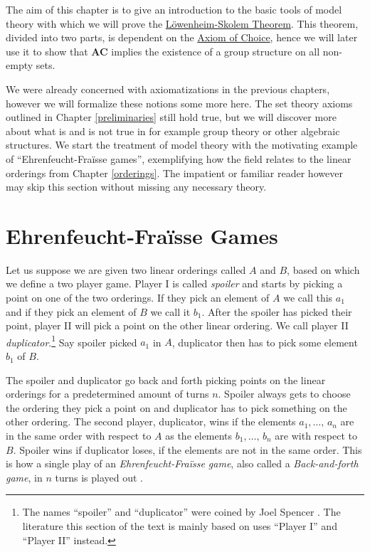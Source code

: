 \documentclass[../../main.tex]{subfiles}
\begin{document}
The aim of this chapter is to give an introduction to the basic tools of model theory with which we will prove the \hyperref[up-lowenheim-skolem]{Löwenheim-Skolem Theorem}.
This theorem, divided into two parts, is dependent on the \hyperref[choice-axiom]{Axiom of Choice}, 
hence we will later use it to show that \textbf{AC} implies the existence of a group structure on all non-empty sets.

We were already concerned with axiomatizations in the previous chapters, however we will formalize these notions some more here.
The set theory axioms outlined in Chapter \ref{preliminaries} still hold true, 
but we will discover more about what is and is not true in for example group theory or other algebraic structures.
We start the treatment of model theory with the motivating example of ``Ehrenfeucht-Fra\"isse games'', 
exemplifying how the field relates to the linear orderings from Chapter \ref{orderings}.
The impatient or familiar reader however may skip this section without missing any necessary theory.

\section{Ehrenfeucht-Fra\"isse Games}
Let us suppose we are given two linear orderings called $A$ and $B$, based on which we define a two player game.
Player I is called \textit{spoiler} and starts by picking a point on one of the two orderings.
If they pick an element of $A$ we call this $a_1$ and if they pick an element of $B$ we call it $b_1$.
After the spoiler has picked their point, player II will pick a point on the other linear ordering. 
We call player II \textit{duplicator}.\footnote{The names ``spoiler'' and ``duplicator'' were coined by Joel Spencer \cite[\S 6]{Wil24}.
The literature \cite{Ros82} this section of the text is mainly based on uses ``Player I'' and ``Player II'' instead.}
Say spoiler picked $a_1$ in $A$, duplicator then has to pick some element $b_1$ of $B$.

The spoiler and duplicator go back and forth picking points on the linear orderings for a predetermined amount of turns $n$.
Spoiler always gets to choose the ordering they pick a point on and duplicator has to pick something on the other ordering.
The second player, duplicator, wins if the elements $a_1,\ldots,\, a_n$ are in the same order with respect to $A$ as the elements $b_1,\ldots,\, b_n$ are with respect to $B$.
Spoiler wins if duplicator loses, if the elements are not in the same order. 
This is how a single play of an \textit{Ehrenfeucht-Fra\"isse game}, also called a \textit{Back-and-forth game}, in $n$ turns is played out \cite[\S 6.1]{Ros82}.
\end{document}
